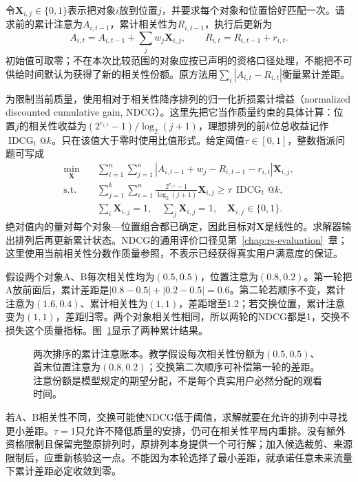 令$\bm{X}_{i,j}\in\{0,1\}$表示把对象$i$放到位置$j$，并要求每个对象和位置恰好匹配一次。请求前的累计注意为$A_{i,t-1}$，累计相关性为$R_{i,t-1}$，执行后更新为
\[
 A_{i,t}=A_{i,t-1}+\sum_jw_j\bm{X}_{i,j},
 \qquad
 R_{i,t}=R_{i,t-1}+r_{i,t}.
\]
初始值可取零；不在本次比较范围的对象应按已声明的资格口径处理，不能把不可供给时间默认为获得了新的相关性份额。原方法用$\sum_i|A_{i,t}-R_{i,t}|$衡量累计差距。

为限制当前质量，使用相对于相关性降序排列的归一化折损累计增益（normalized discounted cumulative gain, NDCG）。这里先把它当作质量约束的具体计算：位置$j$的相关性收益为$(2^{r_{i,t}}-1)/\log_2(j+1)$，理想排列的前$k$位总收益记作$\operatorname{IDCG}_t@k$。只在该值大于零时使用比值形式。给定阈值$\tau\in[0,1]$，整数指派问题可写成
\begin{equation}
 \begin{aligned}
  \min_{\bm{X}}\quad&
    \sum_{i=1}^{n}\sum_{j=1}^{n}
       \left|A_{i,t-1}+w_j-R_{i,t-1}-r_{i,t}\right|
       \bm{X}_{i,j},\\
  \text{s.t.}\quad&
    \sum_{j=1}^{k}\sum_{i=1}^{n}
       \frac{2^{r_{i,t}}-1}{\log_2(j+1)}\bm{X}_{i,j}
       \geq\tau\,\operatorname{IDCG}_t@k,\\
  &\sum_i\bm{X}_{i,j}=1,\quad
   \sum_j\bm{X}_{i,j}=1,\quad
   \bm{X}_{i,j}\in\{0,1\}.
 \end{aligned}
 \label{eq:rs-equity-assignment}
\end{equation}
绝对值内的量对每个对象—位置组合都已确定，因此目标对$\bm{X}$是线性的。求解器输出排列后再更新累计状态。NDCG的通用评价口径见第~\ref{chap:rs-evaluation}~章；这里使用当前相关性分数作质量参照，不表示已经获得真实用户满意度的保证。

假设两个对象A、B每次相关性均为$(0.5,0.5)$，位置注意为$(0.8,0.2)$。第一轮把A放前面后，累计差距是$|0.8-0.5|+|0.2-0.5|=0.6$。第二轮若顺序不变，累计注意为$(1.6,0.4)$、累计相关性为$(1,1)$，差距增至1.2；若交换位置，累计注意变为$(1,1)$，差距归零。两个对象相关性相同，所以两轮的NDCG都是1，交换不损失这个质量指标。图~\ref{fig:rs-attention-accounting}显示了两种累计结果。

\begin{figure}[htbp]
 \centering
 
 \caption{两次排序的累计注意账本。教学假设每次相关性份额为$(0.5,0.5)$、首末位置注意为$(0.8,0.2)$；交换第二次顺序可补偿第一轮的差距。注意份额是模型规定的期望分配，不是每个真实用户必然分配的观看时间。}
 \label{fig:rs-attention-accounting}
\end{figure}

若A、B相关性不同，交换可能使NDCG低于阈值，求解就要在允许的排列中寻找更小差距。$\tau=1$只允许不降低质量的安排，仍可在相关性平局内重排。没有额外资格限制且保留完整原排列时，原排列本身提供一个可行解；加入候选裁剪、来源限制后，应重新核验这一点。不能因为本轮选择了最小差距，就承诺任意未来流量下累计差距必定收敛到零。

